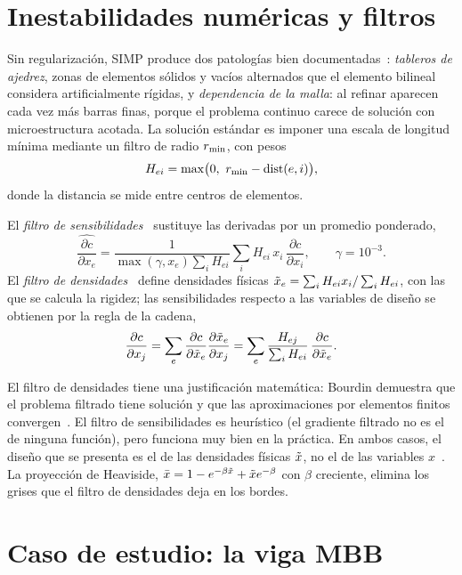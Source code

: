 \section{Inestabilidades numéricas y filtros}

Sin regularización, SIMP produce dos patologías bien documentadas~\cite{sigpet}: \emph{tableros de ajedrez}, zonas de elementos sólidos y vacíos alternados que el elemento bilineal considera artificialmente rígidas, y \emph{dependencia de la malla}: al refinar aparecen cada vez más barras finas, porque el problema continuo carece de solución con microestructura acotada. La solución estándar es imponer una escala de longitud mínima mediante un filtro de radio $r_{\min}$, con pesos
\[
H_{ei}=\max\bigl(0,\ \rmin-\operatorname{dist}(e,i)\bigr),
\]
donde la distancia se mide entre centros de elementos.

\begin{definicion}\label{def:filtros}
El \emph{filtro de sensibilidades}~\cite{sigmund99,andreassen} sustituye las derivadas por un promedio ponderado,
\[
\widehat{\frac{\partial c}{\partial x_e}}=\frac{1}{\max(\gamma,x_e)\sum_iH_{ei}}\sum_iH_{ei}\,x_i\,\frac{\partial c}{\partial x_i},\qquad \gamma=10^{-3}.
\]
El \emph{filtro de densidades}~\cite{bourdin} define densidades físicas $\tilde{x}_e=\sum_iH_{ei}x_i/\sum_iH_{ei}$, con las que se calcula la rigidez; las sensibilidades respecto a las variables de diseño se obtienen por la regla de la cadena,
\[
\frac{\partial c}{\partial x_j}=\sum_e\frac{\partial c}{\partial\tilde{x}_e}\frac{\partial\tilde{x}_e}{\partial x_j}=\sum_e\frac{H_{ej}}{\sum_iH_{ei}}\,\frac{\partial c}{\partial\tilde{x}_e}.
\]
\end{definicion}

El filtro de densidades tiene una justificación matemática: Bourdin demuestra que el problema filtrado tiene solución y que las aproximaciones por elementos finitos convergen~\cite{bourdin}. El filtro de sensibilidades es heurístico (el gradiente filtrado no es el de ninguna función), pero funciona muy bien en la práctica. En ambos casos, el diseño que se presenta es el de las densidades físicas $\tilde{x}$, no el de las variables $x$~\cite[§2.3]{andreassen}. La proyección de Heaviside, $\bar x=1-e^{-\beta\tilde{x}}+\tilde{x} e^{-\beta}$ con $\beta$ creciente, elimina los grises que el filtro de densidades deja en los bordes.

\section{Caso de estudio: la viga MBB}

